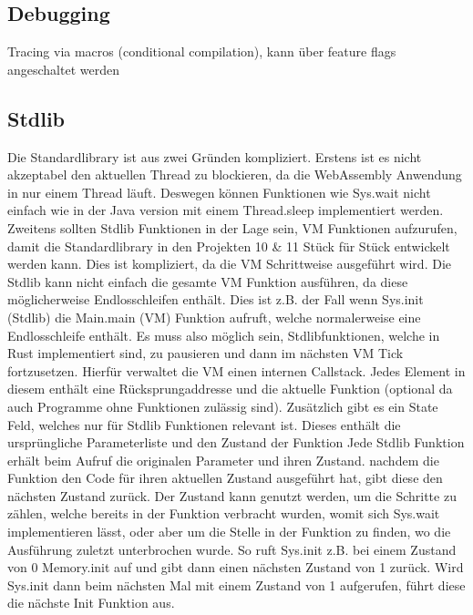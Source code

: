 \subsection{Debugging}
Tracing via macros (conditional compilation), kann über feature flags angeschaltet werden

\subsection{Stdlib}
Die Standardlibrary ist aus zwei Gründen kompliziert. Erstens ist es nicht akzeptabel den aktuellen Thread zu blockieren, da die WebAssembly Anwendung in nur einem Thread läuft. Deswegen können Funktionen wie Sys.wait nicht einfach wie in der Java version mit einem Thread.sleep implementiert werden.
Zweitens sollten Stdlib Funktionen in der Lage sein, VM Funktionen aufzurufen, damit die Standardlibrary in den Projekten 10 & 11 Stück für Stück entwickelt werden kann. Dies ist kompliziert, da die VM Schrittweise ausgeführt wird. Die Stdlib kann nicht einfach die gesamte VM Funktion ausführen, da diese möglicherweise Endlosschleifen enthält. Dies ist z.B. der Fall wenn Sys.init (Stdlib) die Main.main (VM) Funktion aufruft, welche normalerweise eine Endlosschleife enthält.
Es muss also möglich sein, Stdlibfunktionen, welche in Rust implementiert sind, zu pausieren und dann im nächsten VM Tick fortzusetzen.
Hierfür verwaltet die VM einen internen Callstack. Jedes Element in diesem enthält eine Rücksprungaddresse und die aktuelle Funktion (optional da auch Programme ohne Funktionen zulässig sind).
Zusätzlich gibt es ein State Feld, welches nur für Stdlib Funktionen relevant ist. Dieses enthält die ursprüngliche Parameterliste und den Zustand der Funktion
Jede Stdlib Funktion erhält beim Aufruf die originalen Parameter und ihren Zustand.
nachdem die Funktion den Code für ihren aktuellen Zustand ausgeführt hat, gibt diese den nächsten Zustand zurück.
Der Zustand kann genutzt werden, um die Schritte zu zählen, welche bereits in der Funktion verbracht wurden, womit sich Sys.wait implementieren lässt, oder aber um die Stelle in der Funktion zu finden, wo die Ausführung zuletzt unterbrochen wurde. So ruft Sys.init z.B. bei einem Zustand von 0 Memory.init auf und gibt dann einen nächsten Zustand von 1 zurück. Wird Sys.init dann beim nächsten Mal mit einem Zustand von 1 aufgerufen, führt diese die nächste Init Funktion aus.
